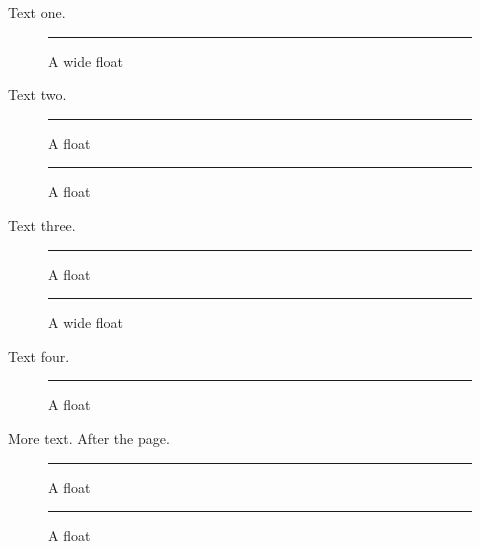 \documentclass{article}
\newcommand\fig[1]{\begin{figure}[#1]\centering
  \rule{1cm}{\pdfuniformdeviate 300pt}\caption{A float}\end{figure}}
\newcommand\wfig[1]{\begin{figure}[#1]\centering
  \rule{1cm}{\pdfuniformdeviate 300pt}\caption{A wide float}\end{figure}}
\begin{document}
Text one.
\wfig{h!}
Text two.
\fig{htbp}
\fig{h!}
Text three.
\fig{htbp}
\wfig{tbp}
Text four.

\fig{htbp}

More text.
\clearpage
After the page.

\fig{htbp}
\fig{h!}
\gdef\SatexReachedEnd{}
\end{document}
